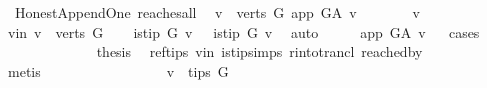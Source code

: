 \begin{isabellebody}
{}
\isamarkuptrue%
%
\endisatagdocument
{\isafolddocument}%
%
\isadelimdocument
%
\endisadelimdocument
{}\isamarkupfalse%
\ {\isacharparenleft}{\kern0pt}\ Honest{\isacharunderscore}{\kern0pt}Append{\isacharunderscore}{\kern0pt}One{\isacharparenright}{\kern0pt}\ reaches{\isacharunderscore}{\kern0pt}all{\isacharcolon}{\kern0pt}\isanewline
\ \ {\isachardoublequoteopen}{\isasymforall}v\ {\isasymin}\ verts\ G{\isachardot}{\kern0pt}\ app\ {\isasymrightarrow}\isactrlsup {\isacharplus}{\kern0pt}\isactrlbsub G{\isacharunderscore}{\kern0pt}A\isactrlesub \ v{\isachardoublequoteclose}\ \ \isanewline
%
\isadelimproof
%
\endisadelimproof
%
\isatagproof
{}\isamarkupfalse%
\ \isanewline
\ \ \isamarkupfalse%
\ v\ \isanewline
\ \ \isamarkupfalse%
\ v{\isacharunderscore}{\kern0pt}in{\isacharcolon}{\kern0pt}\ {\isachardoublequoteopen}v\ {\isasymin}\ verts\ G{\isachardoublequoteclose}\isanewline
\ \ \isamarkupfalse%
\ {\isachardoublequoteopen}is{\isacharunderscore}{\kern0pt}tip\ G\ v{\isachardoublequoteclose}\ {\isacharbar}{\kern0pt}\ {\isachardoublequoteopen}{\isasymnot}\ is{\isacharunderscore}{\kern0pt}tip\ G\ v{\isachardoublequoteclose}\ \isamarkupfalse%
\ auto\isanewline
\ \ \isamarkupfalse%
\ \isamarkupfalse%
\ {\isachardoublequoteopen}app\ {\isasymrightarrow}\isactrlsup {\isacharplus}{\kern0pt}\isactrlbsub G{\isacharunderscore}{\kern0pt}A\isactrlesub \ v{\isachardoublequoteclose}\isanewline
\ \ \isamarkupfalse%
{\isacharparenleft}{\kern0pt}cases{\isacharparenright}{\kern0pt}\isanewline
\ \ \ \ \isamarkupfalse%
\ {}\isanewline
\ \ \ \ \isamarkupfalse%
\ \isamarkupfalse%
\ {\isacharquery}{\kern0pt}thesis\ \isamarkupfalse%
\ ref{\isacharunderscore}{\kern0pt}tips\ v{\isacharunderscore}{\kern0pt}in\ is{\isacharunderscore}{\kern0pt}tip{\isachardot}{\kern0pt}simps\ r{\isacharunderscore}{\kern0pt}into{\isacharunderscore}{\kern0pt}trancl{\isacharprime}{\kern0pt}\ reached{\isacharunderscore}{\kern0pt}by\isanewline
\ \ \ \ \ \ \isamarkupfalse%
\ {\isacharparenleft}{\kern0pt}metis{\isacharparenright}{\kern0pt}\ \isanewline
\ \ \isamarkupfalse%
\isanewline
\ \ \ \ \isamarkupfalse%
\ {}\isanewline
\ \ \ \ \isamarkupfalse%
\ \isamarkupfalse%
\ {\isachardoublequoteopen}v\ {\isasymnotin}\ tips\ G{\isachardoublequoteclose}\ \isamarkupfalse%

\end{isabellebody}
